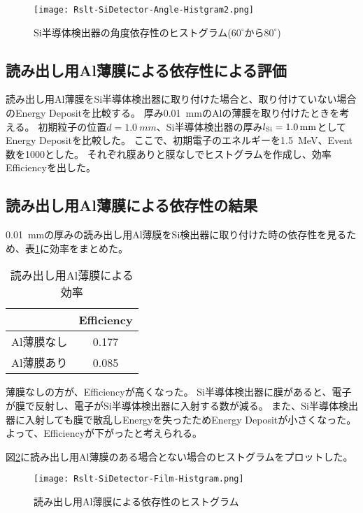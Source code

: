 \documentclass[a4paper,10pt]{jreport}
\begin{document}
\begin{figure}[H]
	\center
	\texttt{[image: Rslt-SiDetector-Angle-Histgram2.png]}
	\caption{Si半導体検出器の角度依存性のヒストグラム($60^{\circ}$から$80^{\circ}$)} \label{Rslt-SiDetector-Angle-Histgram2}
\end{figure}



	
\subsection{読み出し用Al薄膜による依存性による評価}

読み出し用Al薄膜をSi半導体検出器に取り付けた場合と、取り付けていない場合のEnergy Depositを比較する。
厚み\SI{0.01}{mm}のAlの薄膜を取り付けたときを考える。
初期粒子の位置$d=\SI{1.0}{mm}$、Si半導体検出器の厚み$l_{\rm{Si}}=\SI{1.0}{mm}$としてEnergy Depositを比較した。
ここで、初期電子のエネルギーを\SI{1.5}{MeV}、Event数を1000とした。
それぞれ膜ありと膜なしでヒストグラムを作成し、効率Efficiencyを出した。




\subsection{読み出し用Al薄膜による依存性の結果}

\SI{0.01}{mm}の厚みの読み出し用Al薄膜をSi検出器に取り付けた時の依存性を見るため、表\ref{Tab-SiDetector-Film-Efficiency}に効率をまとめた。

\begin{table}[H] 
	\center
	\caption{読み出し用Al薄膜による効率} \label{Tab-SiDetector-Film-Efficiency}
	\begin{tabular}{cc}
		\hline
		 & Efficiency \\
		\hline
		Al薄膜なし & 0.177 \\
		Al薄膜あり & 0.085 \\
		\hline
	\end{tabular}
\end{table}

薄膜なしの方が、Efficiencyが高くなった。
Si半導体検出器に膜があると、電子が膜で反射し、電子がSi半導体検出器に入射する数が減る。
また、Si半導体検出器に入射しても膜で散乱しEnergyを失ったためEnergy Depositが小さくなった。
よって、Efficiencyが下がったと考えられる。

図\ref{Rslt-SiDetector-Film-Histgram}に読み出し用Al薄膜のある場合とない場合のヒストグラムをプロットした。

\begin{figure}[H]
	\center
	\texttt{[image: Rslt-SiDetector-Film-Histgram.png]}
	\caption{読み出し用Al薄膜による依存性のヒストグラム} \label{Rslt-SiDetector-Film-Histgram}
\end{figure}
\end{document}
